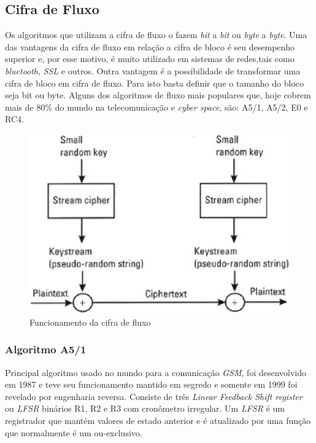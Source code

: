 \subsection{Cifra de Fluxo}
\label{stream-cipher}

Os algoritmos que utilizam a cifra de fluxo o fazem \textit{bit} a \textit{bit} ou \textit{byte} a \textit{byte}. Uma das vantagens da cifra de fluxo em relação a cifra de bloco é seu desempenho superior e, por esse motivo, é muito utilizado em sistemas de redes,tais como \textit{bluetooth}, \textit{SSL} e outros. Outra vantagem é a possibilidade de transformar uma cifra de bloco em cifra de fluxo. Para isto basta definir que o tamanho do bloco seja bit ou byte. Alguns dos algoritmos de fluxo mais populares que, hoje cobrem mais de 80$\%$ do mundo na telecomunicação e \textit{cyber space}, são: A5/1, A5/2, E0 e RC4. ~\cite{majid-mohd}
\begin{figure}[h]
\centering
\includegraphics[keepaspectratio=true,scale=0.7]
    {figuras/stream_cipher.eps}
    \caption[Funcionamento da cifra de fluxo]{Funcionamento da cifra de fluxo\protect\footnotemark} 
\end{figure}

\subsubsection{Algoritmo A5/1}
\label{algorithm-a51}

Principal algoritmo usado no mundo para a comunicação \textit{GSM}, foi desenvolvido em 1987 e teve seu funcionamento mantido em segredo e somente em 1999 foi revelado por engenharia reversa. Consiste de três \textit{Linear Feedback Shift register} ou \textit{LFSR} binários R1, R2 e R3 com cronômetro irregular. Um \textit{LFSR} é um registrador que mantém valores de estado anterior e é atualizado por uma função que normalmente é um ou-exclusivo. 

